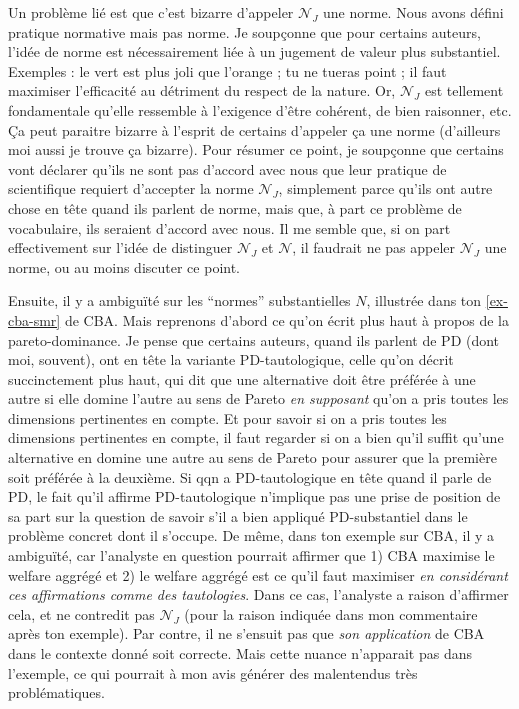 \documentclass[preprint, french, english, 11pt, authoryear]{elsarticle}%
\newcommand{\adv}{\mathscr{N}}
\newcommand{\fadv}{\mathscr{N}_J}%
\begin{document}
Un problème lié est que c’est bizarre d’appeler $\fadv$ une norme. Nous avons défini pratique normative mais pas norme. Je soupçonne que pour certains auteurs, l’idée de norme est nécessairement liée à un jugement de valeur plus substantiel. Exemples : le vert est plus joli que l’orange ; tu ne tueras point ; il faut maximiser l’efficacité au détriment du respect de la nature. Or, $\fadv$ est tellement fondamentale qu’elle ressemble à l’exigence d’être cohérent, de bien raisonner, etc. Ça peut paraitre bizarre à l’esprit de certains d’appeler ça une norme (d’ailleurs moi aussi je trouve ça bizarre). Pour résumer ce point, je soupçonne que certains vont déclarer qu’ils ne sont pas d’accord avec nous que leur pratique de scientifique requiert d’accepter la norme $\fadv$, simplement parce qu’ils ont autre chose en tête quand ils parlent de norme, mais que, à part ce problème de vocabulaire, ils seraient d’accord avec nous. Il me semble que, si on part effectivement sur l’idée de distinguer $\fadv$ et $\adv$, il faudrait ne pas appeler $\fadv$ une norme, ou au moins discuter ce point.

Ensuite, il y a ambiguïté sur les “normes” substantielles $N$, illustrée dans ton \cref{ex-cba-smr} de CBA. Mais reprenons d’abord ce qu’on écrit plus haut à propos de la pareto-dominance. Je pense que certains auteurs, quand ils parlent de PD (dont moi, souvent), ont en tête la variante PD-tautologique, celle qu’on décrit succinctement plus haut, qui dit que une alternative doit être préférée à une autre si elle domine l’autre au sens de Pareto \emph{en supposant} qu’on a pris toutes les dimensions pertinentes en compte. Et pour savoir si on a pris toutes les dimensions pertinentes en compte, il faut regarder si on a bien qu’il suffit qu’une alternative en domine une autre au sens de Pareto pour assurer que la première soit préférée à la deuxième. Si qqn a PD-tautologique en tête quand il parle de PD, le fait qu’il affirme PD-tautologique n’implique pas une prise de position de sa part sur la question de savoir s’il a bien appliqué PD-substantiel dans le problème concret dont il s’occupe. De même, dans ton exemple sur CBA, il y a ambiguïté, car l’analyste en question pourrait affirmer que 1) CBA maximise le welfare aggrégé et 2) le welfare aggrégé est ce qu’il faut maximiser \emph{en considérant ces affirmations comme des tautologies}. Dans ce cas, l’analyste a raison d’affirmer cela, et ne contredit pas $\fadv$ (pour la raison indiquée dans mon commentaire après ton exemple). Par contre, il ne s’ensuit pas que \emph{son application} de CBA dans le contexte donné soit correcte. Mais cette nuance n’apparait pas dans l’exemple, ce qui pourrait à mon avis générer des malentendus très problématiques.
\end{document}
